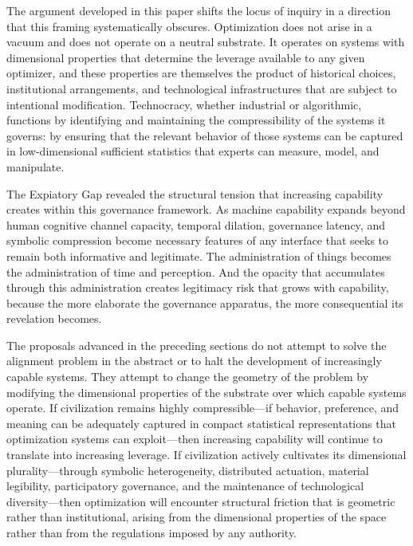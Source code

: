 \documentclass[12pt]{article}
\begin{document}
The argument developed in this paper shifts the locus of inquiry in a direction that this framing systematically obscures. Optimization does not arise in a vacuum and does not operate on a neutral substrate. It operates on systems with dimensional properties that determine the leverage available to any given optimizer, and these properties are themselves the product of historical choices, institutional arrangements, and technological infrastructures that are subject to intentional modification. Technocracy, whether industrial or algorithmic, functions by identifying and maintaining the compressibility of the systems it governs: by ensuring that the relevant behavior of those systems can be captured in low-dimensional sufficient statistics that experts can measure, model, and manipulate.

The Expiatory Gap revealed the structural tension that increasing capability creates within this governance framework. As machine capability expands beyond human cognitive channel capacity, temporal dilation, governance latency, and symbolic compression become necessary features of any interface that seeks to remain both informative and legitimate. The administration of things becomes the administration of time and perception. And the opacity that accumulates through this administration creates legitimacy risk that grows with capability, because the more elaborate the governance apparatus, the more consequential its revelation becomes.

The proposals advanced in the preceding sections do not attempt to solve the alignment problem in the abstract or to halt the development of increasingly capable systems. They attempt to change the geometry of the problem by modifying the dimensional properties of the substrate over which capable systems operate. If civilization remains highly compressible---if behavior, preference, and meaning can be adequately captured in compact statistical representations that optimization systems can exploit---then increasing capability will continue to translate into increasing leverage. If civilization actively cultivates its dimensional plurality---through symbolic heterogeneity, distributed actuation, material legibility, participatory governance, and the maintenance of technological diversity---then optimization will encounter structural friction that is geometric rather than institutional, arising from the dimensional properties of the space rather than from the regulations imposed by any authority.
\end{document}

